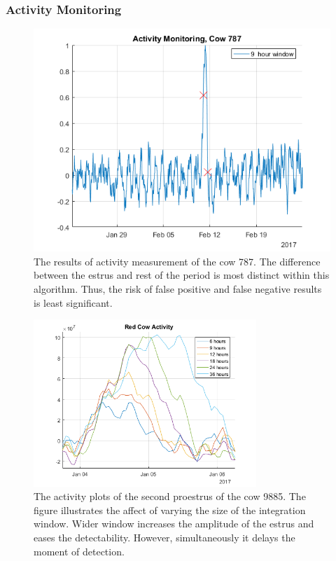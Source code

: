 \documentclass[english,12pt,a4paper,pdftex,elec,utf8]{aaltothesis}
\begin{document}
\subsubsection{Activity Monitoring} \label{activitymeasurementevaluation}


\begin{figure}[htb]
\centering
\includegraphics[width = 0.75 \textwidth]{figures/ActivityMonitoringCow787.png}
\caption{The results of activity measurement of the cow 787. The difference between the estrus and rest of the period is most distinct within this algorithm. Thus, the risk of false positive and false negative results is least significant.}
\label{ActivityMonitoringCow787}
\end{figure}

\begin{figure}[htb]
\centering
\includegraphics[width = 0.75\textwidth]{figures/redcowactivity2.png}
\caption{The activity plots of the second proestrus of the cow 9885. The figure illustrates the affect of varying the size of the integration window. Wider window increases the amplitude of the estrus and eases the detectability. However, simultaneously it delays the moment of detection. }
\label{integrationwindows}
\end{figure}
\end{document}
